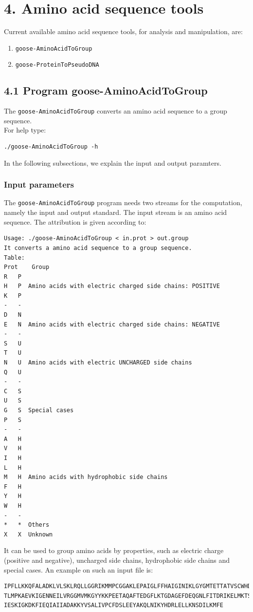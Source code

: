 \documentclass[11pt,journal,compsoc]{report}[1]
\begin{document}
\chapter*{4. Amino acid sequence tools}
\label{seq}

Current available amino acid sequence tools, for analysis and manipulation, are:
\begin{enumerate}
\item \texttt{goose-AminoAcidToGroup}
\item \texttt{goose-ProteinToPseudoDNA}
\end{enumerate}

\section*{4.1 Program goose-AminoAcidToGroup}

The \texttt{goose-AminoAcidToGroup} converts an amino acid sequence to a group 
sequence.\\
For help type:
\begin{lstlisting}
./goose-AminoAcidToGroup -h
\end{lstlisting}
In the following subsections, we explain the input and output paramters.

\subsection*{Input parameters}

The \texttt{goose-AminoAcidToGroup} program needs two streams for the computation,
namely the input and output standard. The input stream is an amino acid sequence.
The attribution is given according to:
\begin{lstlisting}
Usage: ./goose-AminoAcidToGroup < in.prot > out.group
It converts a amino acid sequence to a group sequence.
Table:
Prot	Group
R	P
H	P  Amino acids with electric charged side chains: POSITIVE
K	P
-	-
D	N
E	N  Amino acids with electric charged side chains: NEGATIVE
-	-
S	U
T	U
N	U  Amino acids with electric UNCHARGED side chains
Q	U
-	-
C	S
U	S
G	S  Special cases
P	S
-	-
A	H
V	H
I	H
L	H
M	H  Amino acids with hydrophobic side chains
F	H
Y	H
W	H
-	-
*	*  Others
X	X  Unknown
\end{lstlisting}
It can be used to group amino acids by properties, such as electric charge (positive
and negative), uncharged side chains, hydrophobic side chains and special cases.
An example on such an input file is:
\begin{lstlisting}
IPFLLKKQFALADKLVLSKLRQLLGGRIKMMPCGGAKLEPAIGLFFHAIGINIKLGYGMTETTATVSCWHDFQFNPNSIG
TLMPKAEVKIGENNEILVRGGMVMKGYYKKPEETAQAFTEDGFLKTGDAGEFDEQGNLFITDRIKELMKTSNGKYIAPQY
IESKIGKDKFIEQIAIIADAKKYVSALIVPCFDSLEEYAKQLNIKYHDRLELLKNSDILKMFE
\end{lstlisting}
\end{document}
